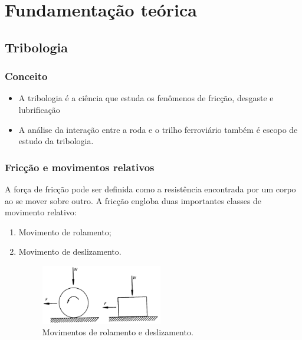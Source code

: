 \documentclass{beamer}
\begin{document}





\section{Fundamentação teórica}

\subsection{Tribologia}
\begin{frame}
\frametitle{Conceito}
	\begin{itemize}
		
	\item A tribologia é a ciência que estuda os fenômenos de fricção, desgaste e lubrificação
	
	\item A análise da interação entre a roda e o trilho ferroviário também é escopo de estudo da tribologia.
	
\end{itemize}
\end{frame}

\begin{frame}
\frametitle{Fricção e movimentos relativos}
A força de fricção pode ser definida como a resistência encontrada por um corpo ao se mover sobre outro. A fricção engloba duas importantes classes de movimento relativo: 
\begin{enumerate}
	\item Movimento de rolamento;
	\item Movimento de deslizamento.
	
	\begin{figure}
		\centering
		\includegraphics[width=0.5\textwidth]{rolamento_deslizamento}
		\caption{Movimentos de rolamento e deslizamento.}
		\label{fig:rolamento_deslizamento}
	\end{figure}
\end{enumerate}
\end{frame}
\end{document}
